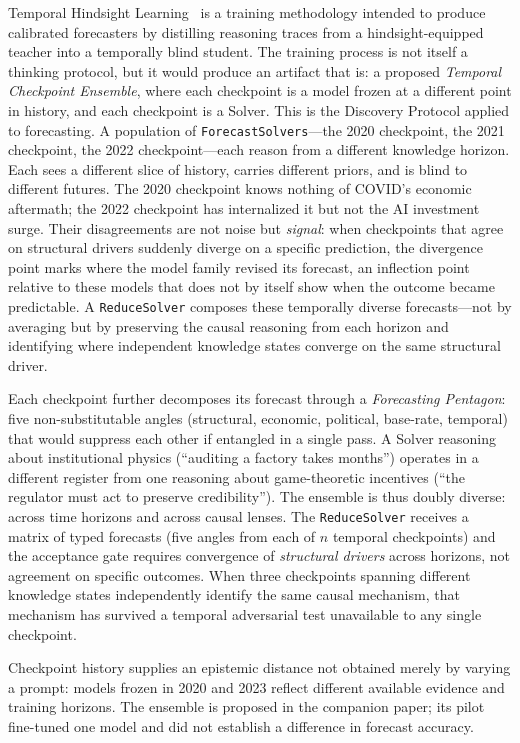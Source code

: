 \documentclass[11pt]{article}
\let\oldtexttt\texttt
\renewcommand{\texttt}[1]{\oldtexttt{\small #1}}
\begin{document}
Temporal Hindsight Learning~\cite{westerberg2026thl} is a training methodology intended to produce calibrated forecasters by distilling reasoning traces from a hindsight-equipped teacher into a temporally blind student. The training process is not itself a thinking protocol, but it would produce an artifact that is: a proposed \emph{Temporal Checkpoint Ensemble}, where each checkpoint is a model frozen at a different point in history, and each checkpoint is a Solver. This is the Discovery Protocol applied to forecasting. A population of \texttt{ForecastSolvers}---the 2020 checkpoint, the 2021 checkpoint, the 2022 checkpoint---each reason from a different knowledge horizon. Each sees a different slice of history, carries different priors, and is blind to different futures. The 2020 checkpoint knows nothing of COVID's economic aftermath; the 2022 checkpoint has internalized it but not the AI investment surge. Their disagreements are not noise but \emph{signal}: when checkpoints that agree on structural drivers suddenly diverge on a specific prediction, the divergence point marks where the model family revised its forecast, an inflection point relative to these models that does not by itself show when the outcome became predictable. A \texttt{ReduceSolver} composes these temporally diverse forecasts---not by averaging but by preserving the causal reasoning from each horizon and identifying where independent knowledge states converge on the same structural driver.

Each checkpoint further decomposes its forecast through a \emph{Forecasting Pentagon}: five non-substitutable angles (structural, economic, political, base-rate, temporal) that would suppress each other if entangled in a single pass. A Solver reasoning about institutional physics (``auditing a factory takes months'') operates in a different register from one reasoning about game-theoretic incentives (``the regulator must act to preserve credibility''). The ensemble is thus doubly diverse: across time horizons and across causal lenses. The \texttt{ReduceSolver} receives a matrix of typed forecasts (five angles from each of $n$ temporal checkpoints) and the acceptance gate requires convergence of \emph{structural drivers} across horizons, not agreement on specific outcomes. When three checkpoints spanning different knowledge states independently identify the same causal mechanism, that mechanism has survived a temporal adversarial test unavailable to any single checkpoint.

Checkpoint history supplies an epistemic distance not obtained merely by varying a prompt: models frozen in 2020 and 2023 reflect different available evidence and training horizons. The ensemble is proposed in the companion paper; its pilot fine-tuned one model and did not establish a difference in forecast accuracy.
\end{document}
